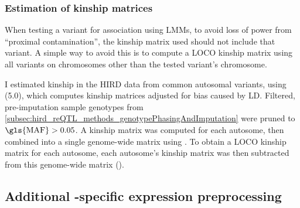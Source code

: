 \subsubsection{Estimation of kinship matrices}

%
When testing a variant for association using \glspl{LMM}, to avoid loss of power from \enquote{proximal contamination}, the kinship matrix used should not include that variant\autocite{listgarten2012ImprovedLinearMixed}.
A simple way to avoid this is to compute a \gls{LOCO} kinship matrix using all variants on chromosomes other than the tested variant's chromosome\autocite{lippert2011FaSTLinearMixed}.

I estimated kinship in the \gls{HIRD} data from common autosomal variants, using  (5.0), which computes kinship matrices adjusted for bias caused by \gls{LD}\autocite{speed2012ImprovedHeritabilityEstimation}.
Filtered, pre-imputation sample genotypes from \autoref{subsec:hird_reQTL_methods_genotypePhasingAndImputation} were pruned to $\text{\gls{MAF}} > 0.05$.
A kinship matrix was computed for each autosome, then combined into a single genome-wide matrix using .
To obtain a \gls{LOCO} kinship matrix for each autosome, each autosome's kinship matrix was then subtracted from this genome-wide matrix ().


\subsection{Additional -specific expression preprocessing}

